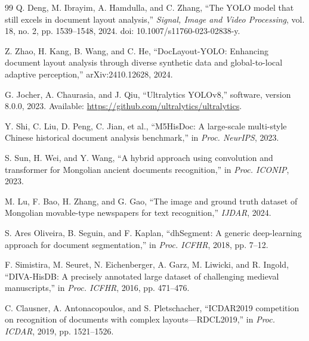 \documentclass[pdflatex,sn-mathphys-num]{sn-jnl}
\begin{document}
\begin{thebibliography}{99}
Q. Deng, M. Ibrayim, A. Hamdulla, and C. Zhang, ``The YOLO model that still excels in document layout analysis,'' \emph{Signal, Image and Video Processing}, vol. 18, no. 2, pp. 1539--1548, 2024. doi: 10.1007/s11760-023-02838-y.

Z. Zhao, H. Kang, B. Wang, and C. He, ``DocLayout-YOLO: Enhancing document layout analysis through diverse synthetic data and global-to-local adaptive perception,'' arXiv:2410.12628, 2024.

G. Jocher, A. Chaurasia, and J. Qiu, ``Ultralytics YOLOv8,'' software, version 8.0.0, 2023. Available: \url{https://github.com/ultralytics/ultralytics}.

Y. Shi, C. Liu, D. Peng, C. Jian, et al., ``M5HisDoc: A large-scale multi-style Chinese historical document analysis benchmark,'' in \emph{Proc. NeurIPS}, 2023.

S. Sun, H. Wei, and Y. Wang, ``A hybrid approach using convolution and transformer for Mongolian ancient documents recognition,'' in \emph{Proc. ICONIP}, 2023.

M. Lu, F. Bao, H. Zhang, and G. Gao, ``The image and ground truth dataset of Mongolian movable-type newspapers for text recognition,'' \emph{IJDAR}, 2024.

S. Ares Oliveira, B. Seguin, and F. Kaplan, ``dhSegment: A generic deep-learning approach for document segmentation,'' in \emph{Proc. ICFHR}, 2018, pp. 7--12.

F. Simistira, M. Seuret, N. Eichenberger, A. Garz, M. Liwicki, and R. Ingold, ``DIVA-HisDB: A precisely annotated large dataset of challenging medieval manuscripts,'' in \emph{Proc. ICFHR}, 2016, pp. 471--476.

C. Clausner, A. Antonacopoulos, and S. Pletschacher, ``ICDAR2019 competition on recognition of documents with complex layouts---RDCL2019,'' in \emph{Proc. ICDAR}, 2019, pp. 1521--1526.

\end{thebibliography}
\end{document}
